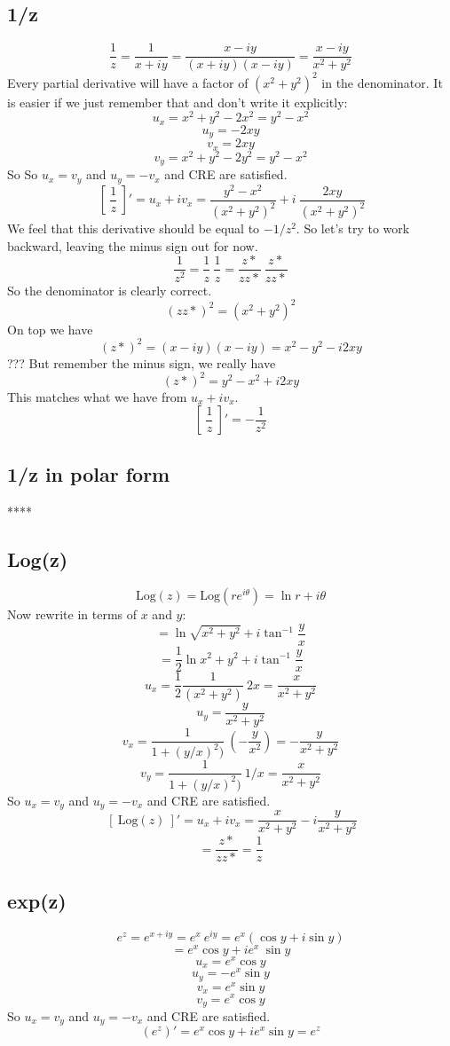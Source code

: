 \documentclass[11pt, oneside]{article}
\begin{document}
\subsection*{1/z}
\[ \frac{1}{z} = \frac{1}{x + iy} = \frac{x - iy}{(x + iy)(x - iy)} = \frac{x - iy}{x^2 + y^2} \]
Every partial derivative will have a factor of $(x^2 + y^2)^2$ in the denominator.  It is easier if we just remember that and don't write it explicitly:\
\[ u_x = x^2 + y^2 - 2x^2 = y^2 - x^2 \]
\[ u_y = -2xy \]
\[ v_x = 2xy \]
\[ v_y = x^2 + y^2 - 2y^2 = y^2 - x^2 \]So
So $u_x = v_y$ and $u_y = -v_x$ and CRE are satisfied.
\[ \ [ \ \frac{1}{z} \ ]' = u_x + i v_x =  \frac{y^2 - x^2}{(x^2 + y^2)^2} + i \ \frac{2xy}{(x^2 + y^2)^2} \]
We feel that this derivative should be equal to $-1/z^2$.  So let's try to work backward, leaving the minus sign out for now.
\[ \frac{1}{z^2} = \frac{1}{z} \ \frac{1}{z} = \frac{z*}{zz*} \ \frac{z*}{zz*} \]
So the denominator is clearly correct.
\[ (zz*)^2 = (x^2 + y^2)^2 \]
On top we have
\[ (z*)^2 = (x - iy)(x - iy) = x^2 - y^2 -i2xy \]
???
But remember the minus sign, we really have
\[ (z*)^2 = y^2 - x^2 + i2xy \]
This matches what we have from $u_x + i v_x$.
\[ [ \ \frac{1}{z} \ ]' = - \frac{1}{z^2} \]

\subsection*{1/z in polar form}
****

\subsection*{Log(z)}
\[ \text{Log}(z) = \text{Log}(r e^{i \theta}) = \ln r + i \theta \]
Now rewrite in terms of $x$ and $y$:
\[ = \ln \sqrt{x^2 + y^2} + i \tan^{-1} \frac{y}{x} \]
\[ = \frac{1}{2} \ln x^2 + y^2 + i \tan^{-1} \frac{y}{x} \]
\[ u_x = \frac{1}{2}  \frac{1}{(x^2 + y^2)} \ 2x = \frac{x}{x^2 + y^2} \]
\[ u_y = \frac{y}{x^2 + y^2} \]
\[ v_x = \frac{1}{1 + (y/x)^2)} \ (-\frac{y}{x^2}) = -\frac{y}{x^2 + y^2}  \]
\[ v_y = \frac{1}{1 + (y/x)^2)} \ {1/x} = \frac{x}{x^2 + y^2} \]
So $u_x = v_y$ and $u_y = -v_x$ and CRE are satisfied.
\[ \ [ \ \text{Log}(z) \ ]' = u_x + i v_x = \frac{x}{x^2 + y^2} - i \frac{y}{x^2 + y^2}  \]
\[ = \frac{z*}{z z*} = \frac{1}{z} \]

\subsection*{exp(z)}
\[ e^z = e^{x + iy} = e^x \ e^{iy} = e^x (\cos y + i \sin y) \]
\[ = e^x \cos y + ie^x \ \sin y \]
\[ u_x = e^x \cos y \]
\[ u_y = - e^x \sin y \]
\[ v_x = e^x \sin y \]
\[ v_y = e^x \cos y \]
So $u_x = v_y$ and $u_y = -v_x$ and CRE are satisfied.
\[ (e^z)' = e^x \cos y + i e^x \sin y = e^z \]
\end{document}
